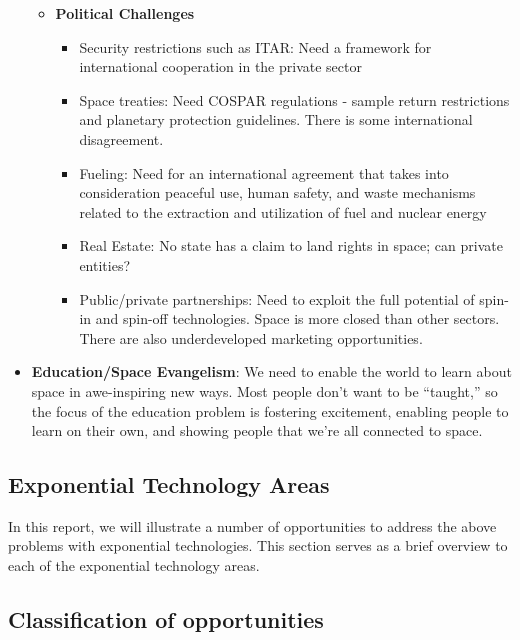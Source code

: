 \documentclass[letter,11pt]{article}
\begin{document}
\begin{itemize}
\begin{itemize}
			\item \textbf{Political Challenges} \begin{itemize}
					\item Security restrictions such as \gls{ITAR}: Need a framework for international cooperation in the private sector
					\item Space treaties:  Need \gls{COSPAR} regulations - sample return restrictions and planetary protection guidelines. There is some international disagreement.
					\item Fueling: Need for an international agreement that takes into consideration peaceful use, human safety, and waste mechanisms related to the extraction and utilization of fuel and nuclear energy
					\item Real Estate: No state has a claim to land rights in space; can private entities?
					\item Public/private partnerships: Need to exploit the full potential of spin-in and spin-off technologies. Space is more closed than other sectors. There are also underdeveloped marketing opportunities.
				\end{itemize}
		\end{itemize}
	\item \textbf{Education/Space Evangelism}: We need to enable the world to learn about space in awe-inspiring new ways. Most people don't want to be ``taught,'' so the focus of the education problem is fostering excitement, enabling people to learn on their own, and showing people that we're all connected to space.
\end{itemize}


\subsection{Exponential Technology Areas}

In this report, we will illustrate a number of opportunities to address the
above problems with exponential technologies. This section serves as a brief
overview to each of the exponential technology areas.



\subsection{Classification of opportunities}
\end{document}
